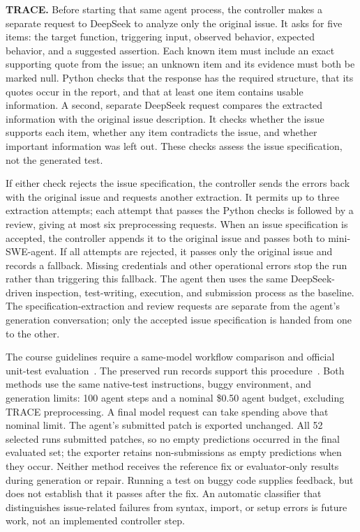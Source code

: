 \textbf{TRACE.} Before starting that same agent process, the controller makes a separate request to DeepSeek to analyze only the original issue. It asks for five items: the target function, triggering input, observed behavior, expected behavior, and a suggested assertion. Each known item must include an exact supporting quote from the issue; an unknown item and its evidence must both be marked null. Python checks that the response has the required structure, that its quotes occur in the report, and that at least one item contains usable information. A second, separate DeepSeek request compares the extracted information with the original issue description. It checks whether the issue supports each item, whether any item contradicts the issue, and whether important information was left out. These checks assess the issue specification, not the generated test.

If either check rejects the issue specification, the controller sends the errors back with the original issue and requests another extraction. It permits up to three extraction attempts; each attempt that passes the Python checks is followed by a review, giving at most six preprocessing requests. When an issue specification is accepted, the controller appends it to the original issue and passes both to mini-SWE-agent. If all attempts are rejected, it passes only the original issue and records a fallback. Missing credentials and other operational errors stop the run rather than triggering this fallback. The agent then uses the same DeepSeek-driven inspection, test-writing, execution, and submission process as the baseline. The specification-extraction and review requests are separate from the agent's generation conversation; only the accepted issue specification is handed from one to the other.

The course guidelines require a same-model workflow comparison and official unit-test evaluation~\cite{guidelines}. The preserved run records support this procedure~\cite{artifacts}. Both methods use the same native-test instructions, buggy environment, and generation limits: 100 agent steps and a nominal \$0.50 agent budget, excluding TRACE preprocessing. A final model request can take spending above that nominal limit. The agent's submitted patch is exported unchanged. All 52 selected runs submitted patches, so no empty predictions occurred in the final evaluated set; the exporter retains non-submissions as empty predictions when they occur. Neither method receives the reference fix or evaluator-only results during generation or repair. Running a test on buggy code supplies feedback, but does not establish that it passes after the fix. An automatic classifier that distinguishes issue-related failures from syntax, import, or setup errors is future work, not an implemented controller step.

